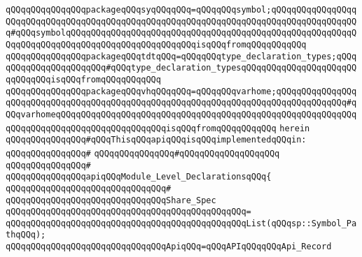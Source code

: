 \verb|qQQqqQQqqQQqqQQqpackageqQQqsyqQQqqQQq=qQQqqQQqsymbol;qQQqqQQqqQQqqQQqqQQqqQQqqQQqqQQqqQQqqQQqqQQqqQQqqQQqqQQqqQQqqQQqqQQqqQQqqQQqqQQqqQQqqQQq#qQQqsymbolqQQqqQQqqQQqqQQqqQQqqQQqqQQqqQQqqQQqqQQqqQQqqQQqqQQqqQQqqQQqqQQqqQQqqQQqqQQqqQQqqQQqqQQqqQQqqQQqisqQQqfromqQQqqQQqqQQq|\newline
\verb|qQQqqQQqqQQqqQQqpackageqQQqtdtqQQq=qQQqqQQqtype_declaration_types;qQQqqQQqqQQqqQQqqQQqqQQq#qQQqtype_declaration_typesqQQqqQQqqQQqqQQqqQQqqQQqqQQqqQQqisqQQqfromqQQqqQQqqQQq|\newline
\verb|qQQqqQQqqQQqqQQqpackageqQQqvhqQQqqQQq=qQQqqQQqvarhome;qQQqqQQqqQQqqQQqqQQqqQQqqQQqqQQqqQQqqQQqqQQqqQQqqQQqqQQqqQQqqQQqqQQqqQQqqQQqqQQqqQQq#qQQqvarhomeqQQqqQQqqQQqqQQqqQQqqQQqqQQqqQQqqQQqqQQqqQQqqQQqqQQqqQQqqQQqqQQqqQQqqQQqqQQqqQQqqQQqqQQqqQQqisqQQqfromqQQqqQQqqQQq|\newline
\verb|herein|\newline
\newline
\verb|qQQqqQQqqQQqqQQq#qQQqThisqQQqapiqQQqisqQQqimplementedqQQqin:|\newline
\verb|qQQqqQQqqQQqqQQq#|\newline
\verb|qQQqqQQqqQQqqQQq#qQQqqQQqqQQqqQQqqQQq|\newline
\verb|qQQqqQQqqQQqqQQq#|\newline
\verb|qQQqqQQqqQQqqQQqapiqQQqModule_Level_DeclarationsqQQq{|\newline
\verb|qQQqqQQqqQQqqQQqqQQqqQQqqQQqqQQq#|\newline
\verb|qQQqqQQqqQQqqQQqqQQqqQQqqQQqqQQqShare_Spec|\newline
\verb|qQQqqQQqqQQqqQQqqQQqqQQqqQQqqQQqqQQqqQQqqQQqqQQq=|\newline
\verb|qQQqqQQqqQQqqQQqqQQqqQQqqQQqqQQqqQQqqQQqqQQqqQQqList(qQQqsp::Symbol_PathqQQq);|\newline
\newline
\newline
\verb|qQQqqQQqqQQqqQQqqQQqqQQqqQQqqQQqApiqQQq=qQQqAPIqQQqqQQqApi_Record|\newline
